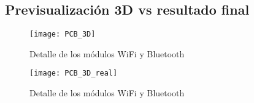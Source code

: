 \subsection{Previsualización 3D vs resultado final\label{sec:Modelo_3D}}


\begin{figure} [h]
    \centering
    \texttt{[image: PCB\_3D]}
    \caption{Detalle de los módulos WiFi y Bluetooth}
    \label{fig:Detalle_inalambrica}
\end{figure}

\begin{figure} [h]
    \centering
    \texttt{[image: PCB\_3D\_real]}
    \caption{Detalle de los módulos WiFi y Bluetooth}
    \label{fig:Detalle_inalambrica}
\end{figure}